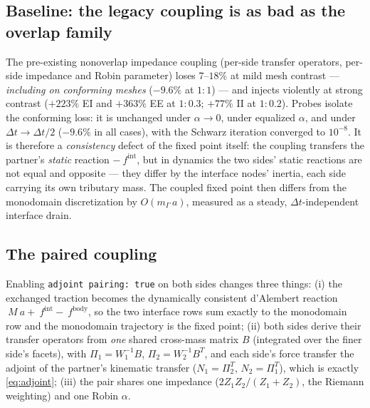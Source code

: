 \documentclass[11pt]{article}
\newcommand{\code}[1]{\texttt{#1}}
\begin{document}
\subsection{Baseline: the legacy coupling is as bad as the overlap family}

The pre-existing nonoverlap impedance coupling (per-side transfer operators,
per-side impedance and Robin parameter) loses $7$--$18\%$ at mild mesh
contrast --- \emph{including on conforming meshes} ($-9.6\%$ at $1{:}1$) ---
and injects violently at strong contrast ($+223\%$ EI and $+363\%$ EE at
$1{:}0.3$; $+77\%$ II at $1{:}0.2$). Probes isolate the conforming loss: it is
unchanged under $\alpha \to 0$, under equalized $\alpha$, and under
$\Delta t \to \Delta t/2$ ($-9.6\%$ in all cases), with the Schwarz iteration
converged to $10^{-8}$. It is therefore a \emph{consistency} defect of the
fixed point itself: the coupling transfers the partner's \emph{static}
reaction $-~f^{\mathrm{int}}$, but in dynamics the two sides' static
reactions are not equal and opposite --- they differ by the interface nodes'
inertia, each side carrying its own tributary mass. The coupled fixed point
then differs from the monodomain discretization by $O(m_\Gamma\,a)$,
measured as a steady, $\Delta t$-independent interface drain.

\subsection{The paired coupling}

Enabling \code{adjoint pairing: true} on both sides changes three things:
(i) the exchanged traction becomes the dynamically consistent d'Alembert reaction
$~M ~a + ~f^{\mathrm{int}} - ~f^{\mathrm{body}}$, so the two interface rows
sum exactly to the monodomain row and the monodomain trajectory is the fixed
point; (ii) both sides derive their transfer operators from \emph{one} shared
cross-mass matrix $B$ (integrated over the finer side's facets), with
$\Pi_1 = W_1^{-1}B$, $\Pi_2 = W_2^{-1}B^{T}$, and each side's force transfer
the adjoint of the partner's kinematic transfer ($N_1 = \Pi_2^{T}$,
$N_2 = \Pi_1^{T}$), which is exactly \eqref{eq:adjoint}; (iii) the pair
shares one impedance ($2Z_1Z_2/(Z_1{+}Z_2)$, the Riemann weighting) and one
Robin $\alpha$.
\end{document}
